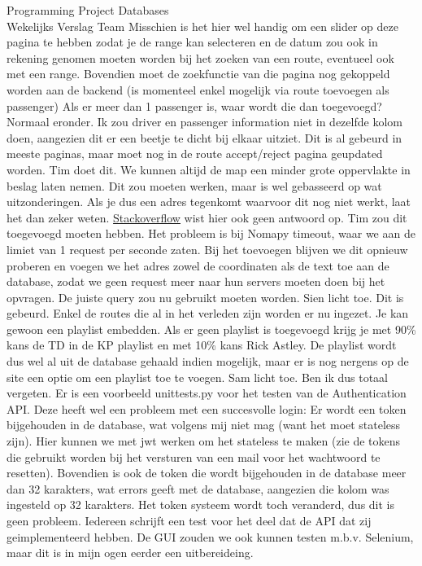 \documentclass{article}
\newcounter{team}
\begin{document}
\begin{Minutes}{Programming Project Databases \\ Wekelijks Verslag Team }
				    Misschien is het hier wel handig om een slider op deze pagina te hebben zodat je de range kan selecteren en de datum zou ook in rekening genomen moeten worden bij het zoeken van een route, eventueel ook met een range. Bovendien moet de zoekfunctie van die pagina nog gekoppeld worden aan de backend (is momenteel enkel mogelijk via route toevoegen als passenger)
				    Als er meer dan 1 passenger is, waar wordt die dan toegevoegd? Normaal eronder. Ik zou driver en passenger information niet in dezelfde kolom doen, aangezien dit er een beetje te dicht bij elkaar uitziet. Dit is al gebeurd in meeste paginas, maar moet nog in de route accept/reject pagina geupdated worden. Tim doet dit. We kunnen altijd de map een minder grote oppervlakte in beslag laten nemen.
				    Dit zou moeten werken, maar is wel gebasseerd op wat uitzonderingen. Als je dus een adres tegenkomt waarvoor dit nog niet werkt, laat het dan zeker weten. \href{https://stackoverflow.com/questions/60994091/is-there-a-way-to-convert-a-geopy-location-to-a-short-address-string}{Stackoverflow} wist hier ook geen antwoord op.
				    Tim zou dit toegevoegd moeten hebben. Het probleem is bij Nomapy timeout, waar we aan de limiet van 1 request per seconde zaten. Bij het toevoegen blijven we dit opnieuw proberen en voegen we het adres zowel de coordinaten als de text toe aan de database, zodat we geen request meer naar hun servers moeten doen bij het opvragen.
				    De juiste query zou nu gebruikt moeten worden. Sien licht toe. Dit is gebeurd. Enkel de routes die al in het verleden zijn worden er nu ingezet.
				    Je kan gewoon een playlist embedden. Als er geen playlist is toegevoegd krijg je met 90\% kans de TD in de KP playlist {\tiny en met 10\% kans Rick Astley}. De playlist wordt dus wel al uit de database gehaald indien mogelijk, maar er is nog nergens op de site een optie om een playlist toe te voegen.
				    Sam licht toe. Ben ik dus totaal vergeten.
				    Er is een voorbeeld unittests.py voor het testen van de Authentication API. Deze heeft wel een probleem met een succesvolle login: Er wordt een token bijgehouden in de database, wat volgens mij niet mag (want het moet stateless zijn). Hier kunnen we met jwt werken om het stateless te maken (zie de tokens die gebruikt worden bij het versturen van een mail voor het wachtwoord te resetten). Bovendien is ook de token die wordt bijgehouden in de database meer dan 32 karakters, wat errors geeft met de database, aangezien die kolom was ingesteld op 32 karakters. Het token systeem wordt toch veranderd, dus dit is geen probleem. Iedereen schrijft een test voor het deel dat de API dat zij geimplementeerd hebben. De GUI zouden we ook kunnen testen m.b.v. Selenium, maar dit is in mijn ogen eerder een uitbereideing.

\end{Minutes}
\end{document}
